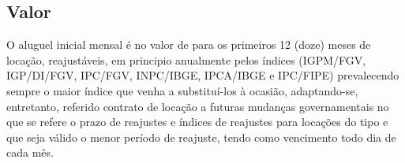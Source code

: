 \subsection{Valor}\label{sub-sec:payment}
O aluguel inicial mensal é no valor de \valorInicial para os primeiros 12 (doze) meses de locação, reajustáveis, em principio anualmente pelos índices (IGPM/FGV, IGP/DI/FGV, IPC/FGV, INPC/IBGE, IPCA/IBGE e IPC/FIPE) prevalecendo sempre o maior índice que venha a substituí-los à ocasião, adaptando-se, entretanto, referido contrato de locação a futuras mudanças governamentais no que se refere o prazo de reajustes e índices de reajustes para locações do tipo \FinalidadeImovel e que seja válido o menor período de reajuste, tendo como vencimento todo dia \diadepagamento de cada mês. 

